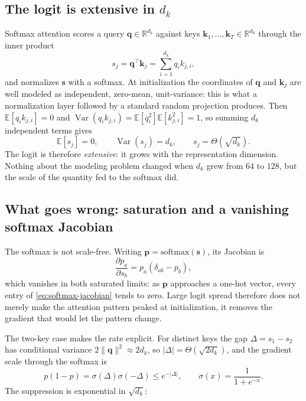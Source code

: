 \documentclass[11pt]{article}
\newcommand{\R}{\mathbb{R}}
\newcommand{\ve}[1]{\boldsymbol{#1}}
\newcommand{\tr}{\intercal}
\begin{document}
\subsection*{The logit is extensive in $d_k$}

Softmax attention scores a query $\ve{q}\in\R^{d_k}$ against keys
$\ve{k}_1,\ldots,\ve{k}_T\in\R^{d_k}$ through the inner product
\[
  s_j=\ve{q}^{\tr}\ve{k}_j=\sum_{i=1}^{d_k}q_ik_{j,i},
\]
and normalizes $\ve{s}$ with a softmax. At initialization the coordinates of $\ve{q}$ and
$\ve{k}_j$ are well modeled as independent, zero-mean, unit-variance: this is what a normalization
layer followed by a standard random projection produces. Then $\mathbb{E}[q_ik_{j,i}]=0$ and
$\operatorname{Var}(q_ik_{j,i})=\mathbb{E}[q_i^2]\mathbb{E}[k_{j,i}^2]=1$, so summing $d_k$
independent terms gives
\begin{equation}
  \mathbb{E}[s_j]=0,
  \qquad
  \operatorname{Var}(s_j)=d_k,
  \qquad
  s_j=\Theta(\sqrt{d_k}).
  \label{eq:logit-variance}
\end{equation}
The logit is therefore \emph{extensive}: it grows with the representation dimension. Nothing about
the modeling problem changed when $d_k$ grew from $64$ to $128$, but the scale of the quantity fed
to the softmax did.

\subsection*{What goes wrong: saturation and a vanishing softmax Jacobian}

The softmax is not scale-free. Writing $\ve{p}=\mathrm{softmax}(\ve{s})$, its Jacobian is
\begin{equation}
  \frac{\partial p_a}{\partial s_b}=p_a(\delta_{ab}-p_b),
  \label{eq:softmax-jacobian}
\end{equation}
which vanishes in both saturated limits: as $\ve{p}$ approaches a one-hot vector, every entry of
\eqref{eq:softmax-jacobian} tends to zero. Large logit spread therefore does not merely make the
attention pattern peaked at initialization, it removes the gradient that would let the pattern
change.

The two-key case makes the rate explicit. For distinct keys the gap $\Delta=s_1-s_2$ has
conditional variance $2\|\ve{q}\|^2\approx 2d_k$, so $|\Delta|=\Theta(\sqrt{2d_k})$, and the
gradient scale through the softmax is
\begin{equation}
  p(1-p)=\sigma(\Delta)\sigma(-\Delta)\le e^{-|\Delta|},
  \qquad
  \sigma(x)=\frac{1}{1+e^{-x}}.
  \label{eq:two-key-gradient}
\end{equation}
The suppression is exponential in $\sqrt{d_k}$:
\end{document}
